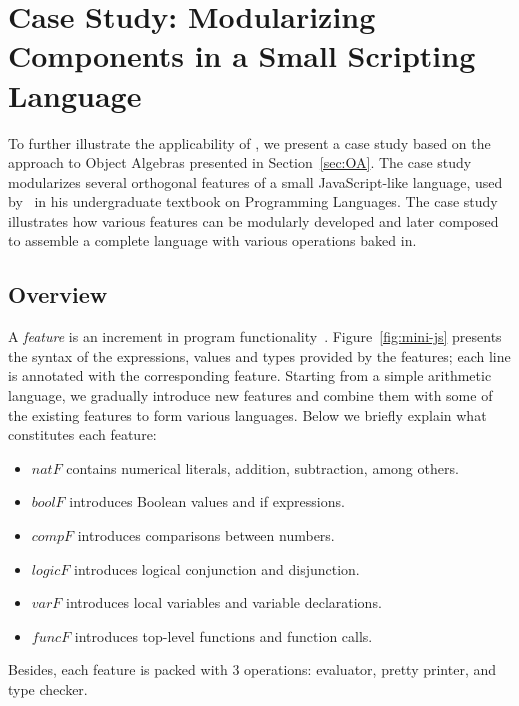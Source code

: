 \section{Case Study: Modularizing Components in a Small Scripting Language}

To further illustrate the applicability of \name, we present a case study based
on the approach to Object Algebras presented in Section~\ref{sec:OA}. The case
study modularizes several orthogonal features of a small
JavaScript-like language, used by~\citet{poplcook} in his undergraduate textbook
on Programming Languages. The case study illustrates how various features can be
modularly developed and later composed to assemble a complete language with
various operations baked in.



\subsection{Overview}

A \textit{feature} is an increment in program functionality~\citep{zave1999faq}.
Figure~\ref{fig:mini-js} presents the syntax of the expressions, values and
types provided by the features; each line is annotated with the corresponding
feature. Starting from a simple arithmetic language, we gradually introduce new
features and combine them with some of the existing features to form various
languages. Below we briefly explain what constitutes each feature:
\begin{itemize}
\item $\mathit{natF}$ contains numerical literals, addition, subtraction, among
  others.
\item $\mathit{boolF}$ introduces Boolean values and if expressions.
\item $\mathit{compF}$ introduces comparisons between numbers.
\item $\mathit{logicF}$ introduces logical conjunction and disjunction.
\item $\mathit{varF}$ introduces local variables and variable declarations.
\item $\mathit{funcF}$ introduces top-level functions and function calls.
\end{itemize}
\noindent Besides, each feature is packed with 3 operations: evaluator, pretty
printer, and type checker.


